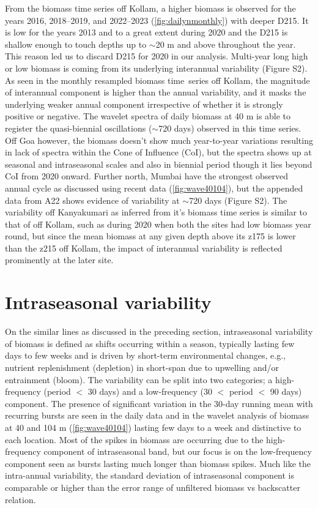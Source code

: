 \documentclass[authoryear,review,12pt]{elsarticle}
\begin{document}
	From the biomass time series off Kollam, a higher biomass is observed for the years 2016, 2018--2019, and 2022--2023 (\cref{fig:dailynmonthly}) with deeper D215. It is low for the years 2013 and to a great extent during 2020 and the D215 is shallow enough to touch depths up to $\sim$20 m and above throughout the year. This reason led us to discard D215 for 2020 in our analysis. Multi-year long high or low biomass is coming from its underlying interannual variability (Figure S2). As seen in the monthly resampled biomass time~series off Kollam, the magnitude of interannual component is higher than the annual variability, and it masks the underlying weaker annual component irrespective of whether it is strongly positive or negative. The wavelet spectra of daily biomass at 40 m is able to register the quasi-biennial oscillations ($\sim$720 days) observed in this time series. Off Goa however, the biomass doesn't show much year-to-year variations resulting in lack of spectra within the Cone of Influence (CoI), but the spectra shows up at seasonal and intraseasonal scales and also in biennial period though it lies beyond CoI from 2020 onward. Further north, Mumbai have the strongest observed annual cycle as discussed using recent data (\cref{fig:wave40104}), but the appended data from A22 shows evidence of variability at $\sim$720 days (Figure S2). The variability off Kanyakumari as inferred from it's biomass time series is similar to that of off Kollam, such as during 2020 when both the sites had low biomass year round, but since the mean biomass at any given depth above its z175 is lower than the z215 off Kollam, the impact of interannual variability is reflected prominently at the later site.  
	
	\section{Intraseasonal variability}
	\label{sec:intsnvar}
	On the similar lines as discussed in the preceding section, intraseasonal variability of biomass is defined as shifts occurring within a season, typically lasting few days to few weeks and is driven by short-term environmental changes, e.g., nutrient  replenishment (depletion) in short-span due to upwelling and/or entrainment (bloom). The variability can be split into two categories; a high-frequency (period $<$ 30 days) and a low-frequency (30 $<$ period $<$ 90 days) component. The presence of significant variation in the 30-day running mean with recurring bursts are seen in the daily data and in the  wavelet analysis of biomass at 40 and 104 m (\cref{fig:wave40104}) lasting few days to a week and distinctive to each location. Most of the spikes in biomass are occurring due to the high-frequency component of intraseasonal band, but our focus is on the low-frequency component seen as bursts lasting much longer than biomass spikes. Much like the intra-annual variability, the standard deviation of intraseasonal component is comparable or higher than the error range of unfiltered biomass vs backscatter relation.
	
\end{document}
